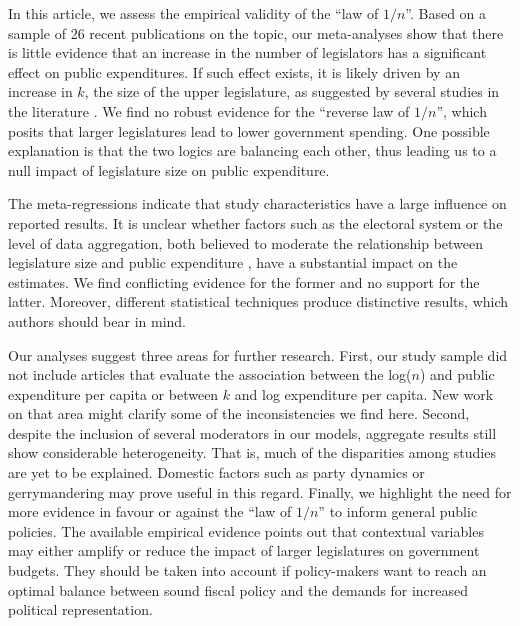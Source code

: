 \documentclass[a4paper,12pt]{article}
\begin{document}
In this article, we assess the empirical validity of the ``law of $1/n$''. Based
on a sample of 26 recent publications on the topic, our meta-analyses show that
there is little evidence that an increase in the number of legislators has a
significant effect on public expenditures. If such effect exists, it is likely
driven by an increase in $k$, the size of the upper legislature, as suggested by
several studies in the literature \citep[e.g.,][]{baqir2002districting, 
bradbury2001legislative, bradbury2003local, chen_malhotra_2007,
gilligan2001fiscal, primo2006stop}. We find no robust evidence for the ``reverse
law of $1/n$'', which posits that larger legislatures lead to lower government
spending. One possible explanation is that the two logics are balancing each
other, thus leading us to a null impact of legislature size on public
expenditure.

The meta-regressions indicate that study characteristics have a large influence
on reported results. It is unclear whether factors such as the electoral system
or the level of data aggregation, both believed to moderate the relationship
between legislature size and public expenditure \citep{primo2008distributive,
baqir2002districting, bradbury2003local}, have a substantial impact on the
estimates. We find conflicting evidence for the former and no support for the
latter. Moreover, different statistical techniques produce distinctive results,
which authors should bear in mind.

Our analyses suggest three areas for further research. First, our study sample
did not include articles that evaluate the association between the log($n$) and
public expenditure per capita or between $k$ and log expenditure per capita.
New work on that area might clarify some of the inconsistencies we find
here. Second, despite the inclusion of several moderators in our models,
aggregate results still show considerable heterogeneity. That is, much of the
disparities among studies are yet to be explained. Domestic factors such as
party dynamics or gerrymandering \citep{lee2015supermajority,
mukherjee2003politicalparties, gilligan2006public} may prove useful in this
regard. Finally, we highlight the need for more evidence in favour or against
the ``law of $1/n$'' to inform general public policies. The available empirical
evidence points out that contextual variables may either amplify or reduce the
impact of larger legislatures on government budgets. They should be taken into
account if policy-makers want to reach an optimal balance between sound fiscal
policy and the demands for increased political representation.


\newpage



\nocite{baskaran2013coalition, bradbury2009spatially, drew2017price,
erler2007termlimits, fiorino2007legislature, hohmann2017effect,
kessler2014communication, lewis2019legislature, lledo2003electoral,
mukherjee2003politicalparties, petterssonlidbom2012size, schaltegger2009large,
stein1998institutional, mukherjee2003politicalparties, macdonald2008impact,
matsusaka2005endogeneity, ricciuti2004legislatures}
\end{document}
